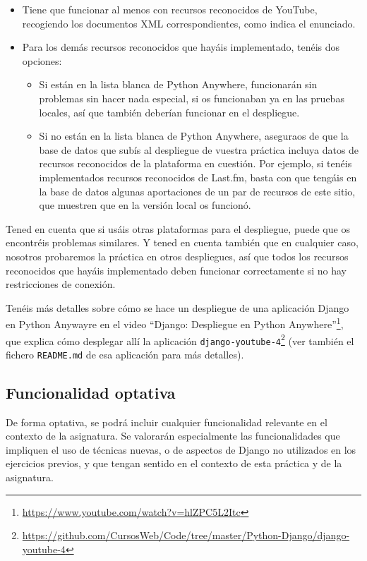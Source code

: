 \begin{itemize}
\item Tiene que funcionar al menos con recursos reconocidos de YouTube, recogiendo los documentos XML correspondientes, como indica el enunciado.
\item Para los demás recursos reconocidos que hayáis implementado, tenéis dos opciones:
  \begin{itemize}
  \item Si están en la lista blanca de Python Anywhere, funcionarán sin problemas sin hacer nada especial, si os funcionaban ya en las pruebas locales, así que también deberían funcionar en el despliegue.
  \item Si no están en la lista blanca de Python Anywhere, aseguraos de que la base de datos que subís al despliegue de vuestra práctica incluya datos de recursos reconocidos de la plataforma en cuestión. Por ejemplo, si tenéis implementados recursos reconocidos de Last.fm, basta con que tengáis en la base de datos algunas aportaciones de un par de recursos de este sitio, que muestren que en la versión local os funcionó.
  \end{itemize}
\end{itemize}

Tened en cuenta que si usáis otras plataformas para el despliegue, puede que os encontréis problemas similares. Y tened en cuenta también que en cualquier caso, nosotros probaremos la práctica en otros despliegues, así que todos los recursos reconocidos que hayáis implementado deben funcionar correctamente si no hay restricciones de conexión.

Tenéis más detalles sobre cómo se hace un despliegue de una aplicación Django en Python Anywayre en el video ``Django: Despliegue en Python Anywhere''\footnote{\url{https://www.youtube.com/watch?v=hlZPC5L2Itc}}, que explica cómo desplegar allí la aplicación \texttt{django-youtube-4}\footnote{\url{https://github.com/CursosWeb/Code/tree/master/Python-Django/django-youtube-4}} (ver también el fichero \texttt{README.md} de esa aplicación para más detalles).

\subsection{Funcionalidad optativa}

De forma optativa, se podrá incluir cualquier funcionalidad relevante en el contexto de la asignatura. Se valorarán especialmente las funcionalidades que impliquen el uso de técnicas nuevas, o de aspectos de Django no utilizados en los ejercicios previos, y que tengan sentido en el contexto de esta práctica y de la asignatura.

